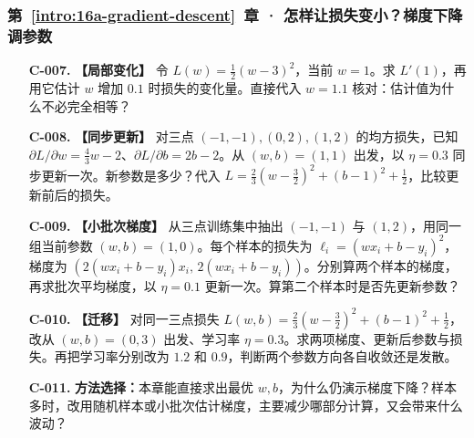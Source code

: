 \subsubsection*{第~\ref*{intro:16a-gradient-descent}~章 · 怎样让损失变小？梯度下降调参数}
\begin{enumerate}[label={},leftmargin=4.8em,itemsep=4pt]
\item[\textbf{C-007.}] \leavevmode{}\label{exercise:C-007}\label{exercise:local-derivative-change}\textbf{【局部变化】} 令 $L(w)=\tfrac12(w-3)^2$，当前 $w=1$。求 $L'(1)$，再用它估计 $w$ 增加 $0.1$ 时损失的变化量。直接代入 $w=1.1$ 核对：估计值为什么不必完全相等？
\item[\textbf{C-008.}] \leavevmode{}\label{exercise:C-008}\label{exercise:synchronous-gradient-step}\textbf{【同步更新】} 对三点 $(-1,-1),(0,2),(1,2)$ 的均方损失，已知 $\partial L/\partial w=\tfrac43w-2$、$\partial L/\partial b=2b-2$。从 $(w,b)=(1,1)$ 出发，以 $\eta=0.3$ 同步更新一次。新参数是多少？代入 $L=\tfrac23(w-\tfrac32)^2+(b-1)^2+\tfrac12$，比较更新前后的损失。
\item[\textbf{C-009.}] \leavevmode{}\label{exercise:C-009}\label{exercise:mini-batch-gradient-average}\textbf{【小批次梯度】} 从三点训练集中抽出 $(-1,-1)$ 与 $(1,2)$，用同一组当前参数 $(w,b)=(1,0)$。每个样本的损失为 $\ell_i=(wx_i+b-y_i)^2$，梯度为 $(2(wx_i+b-y_i)x_i,\,2(wx_i+b-y_i))$。分别算两个样本的梯度，再求批次平均梯度，以 $\eta=0.1$ 更新一次。算第二个样本时是否先更新参数？
\item[\textbf{C-010.}] \leavevmode{}\label{exercise:C-010}\label{exercise:quadratic-gradient-transfer}\textbf{【迁移】} 对同一三点损失 $L(w,b)=\tfrac23(w-\tfrac32)^2+(b-1)^2+\tfrac12$，改从 $(w,b)=(0,3)$ 出发、学习率 $\eta=0.3$。求两项梯度、更新后参数与损失。再把学习率分别改为 $1.2$ 和 $0.9$，判断两个参数方向各自收敛还是发散。
\item[\textbf{C-011.}] \leavevmode{}\label{exercise:C-011}\label{exercise:iterative-method-choice}\textbf{方法选择：}本章能直接求出最优 $w,b$，为什么仍演示梯度下降？样本多时，改用随机样本或小批次估计梯度，主要减少哪部分计算，又会带来什么波动？
\end{enumerate}
